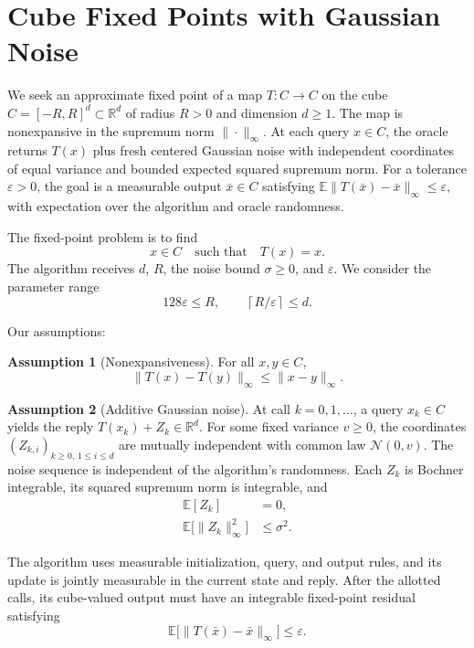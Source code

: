 \documentclass[10pt]{article}
\theoremstyle{definition}
\newtheorem{assumption}{Assumption}
\begin{document}
\section*{Cube Fixed Points with Gaussian Noise}
We seek an approximate fixed point of a map $T:C\to C$ on the cube $C=[-R,R]^d\subset\mathbb{R}^d$ of radius $R>0$ and dimension $d\geq 1$. The map is nonexpansive in the supremum norm $\|\cdot\|_\infty$. At each query $x\in C$, the oracle returns $T(x)$ plus fresh centered Gaussian noise with independent coordinates of equal variance and bounded expected squared supremum norm. For a tolerance $\varepsilon>0$, the goal is a measurable output $\bar{x}\in C$ satisfying $\mathbb{E}\|T(\bar{x})-\bar{x}\|_\infty\leq\varepsilon$, with expectation over the algorithm and oracle randomness.

The fixed-point problem is to find
\[
x\in C\quad\text{such that}\quad T(x)=x.
\]
The algorithm receives $d$, $R$, the noise bound $\sigma\geq 0$, and $\varepsilon$. We consider the parameter range
\[
128\varepsilon\leq R,\qquad
\left\lceil R/\varepsilon\right\rceil\leq d.
\]

Our assumptions:
\begin{assumption}[Nonexpansiveness]
For all $x,y\in C$,
\[
\|T(x)-T(y)\|_\infty\leq\|x-y\|_\infty.
\]
\end{assumption}

\begin{assumption}[Additive Gaussian noise]
At call $k=0,1,\ldots$, a query $x_k\in C$ yields the reply $T(x_k)+Z_k\in\mathbb{R}^d$. For some fixed variance $v\geq 0$, the coordinates $(Z_{k,i})_{k\geq 0,\,1\leq i\leq d}$ are mutually independent with common law $\mathcal{N}(0,v)$. The noise sequence is independent of the algorithm's randomness. Each $Z_k$ is Bochner integrable, its squared supremum norm is integrable, and
\[
\begin{aligned}
\mathbb{E}[Z_k]&=0,\\
\mathbb{E}\bigl[\|Z_k\|_\infty^2\bigr]&\leq\sigma^2.
\end{aligned}
\]
\end{assumption}

The algorithm uses measurable initialization, query, and output rules, and its update is jointly measurable in the current state and reply. After the allotted calls, its cube-valued output must have an integrable fixed-point residual satisfying
\[
\mathbb{E}\bigl[\|T(\bar{x})-\bar{x}\|_\infty\bigr]\leq\varepsilon.
\]
\end{document}

